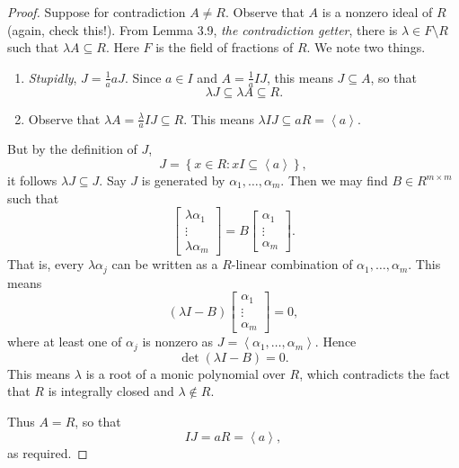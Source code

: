 \documentclass[pmath441]{subfiles}
\begin{document}
\begin{proof}
        Suppose for contradiction $A\neq R$. Observe that $A$ is a nonzero ideal of $R$ (again, check this!). From Lemma 3.9, \textit{the contradiction getter}, there is $\lambda\in F\setminus R$ such that $\lambda A\subseteq R$. Here $F$ is the field of fractions of $R$. We note two things.
        \begin{enumerate}
            \item \textit{Stupidly}, $J = \frac{1}{a}aJ$. Since $a\in I$ and $A=\frac{1}{a}IJ$, this means $J\subseteq A$, so that
                \begin{equation*}
                    \lambda J\subseteq\lambda A\subseteq R.
                \end{equation*}
            \item Observe that $\lambda A = \frac{\lambda}{a}IJ\subseteq R$. This means $\lambda IJ \subseteq aR = \left< a \right>$. 
        \end{enumerate}
        But by the definition of $J$,
        \begin{equation*}
            J = \left\lbrace x\in R: xI\subseteq\left< a \right>  \right\rbrace,
        \end{equation*}
        it follows $\lambda J\subseteq J$. Say $J$ is generated by $\alpha_1,\ldots,\alpha_m$. Then we may find $B\in R^{m\times m}$ such that
        \begin{equation*}
            \begin{bmatrix} \lambda\alpha_1 \\ \vdots \\ \lambda\alpha_m \end{bmatrix} = B \begin{bmatrix} \alpha_1 \\ \vdots \\ \alpha_m \end{bmatrix}.
        \end{equation*}
        That is, every $\lambda\alpha_j$ can be written as a $R$-linear combination of $\alpha_1,\ldots,\alpha_m$. This means
        \begin{equation*}
            \left( \lambda I-B \right) \begin{bmatrix} \alpha_1 \\ \vdots \\ \alpha_m \end{bmatrix} = 0,
        \end{equation*}
        where at least one of $\alpha_j$ is nonzero as $J = \left< \alpha_1,\ldots,\alpha_m \right>$. Hence
        \begin{equation*}
            \det\left( \lambda I-B \right) = 0.
        \end{equation*}
        This means $\lambda$ is a root of a monic polynomial over $R$, which contradicts the fact that $R$ is integrally closed and $\lambda\notin R$.

        Thus $A=R$, so that
        \begin{equation*}
            IJ = aR = \left< a \right>,
        \end{equation*}
        as required.
    \end{proof}
    
\end{document}
